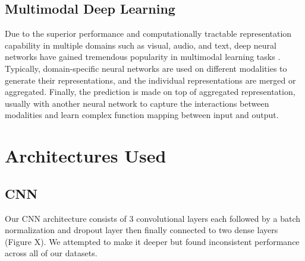 \documentclass{turabian-thesis}
\begin{document}
\subsection{Multimodal Deep Learning}

Due to the superior performance and computationally tractable representation capability in multiple domains such as visual, audio, and text, deep neural networks have gained tremendous popularity in multimodal learning tasks \cite{kim_multimodal_2018}. Typically, domain-specific neural networks are used on different modalities to generate their representations, and the individual representations are merged or aggregated. Finally, the prediction is made on top of aggregated representation, usually with another neural network to capture the interactions between modalities and learn complex function mapping between input and output.



\section{Architectures Used}

\subsection{CNN}

Our CNN architecture consists of 3 convolutional layers each followed by a batch normalization and dropout layer then finally connected to two dense layers (Figure X). We attempted to make it deeper but found inconsistent performance across all of our datasets.
\end{document}
